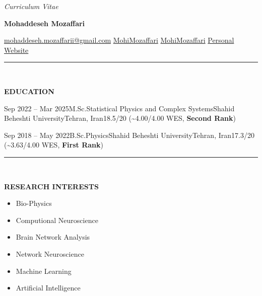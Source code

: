 \documentclass[12pt, b4paper]{cv}
\begin{document}
\begin{center}
	\textit{Curriculum Vitae}\\
	{\Huge \textbf{Mohaddeseh Mozaffari}\par}

	\href{mailto:mohaddeseh.mozaffarii@gmail.com}{ mohaddeseh.mozaffarii@gmail.com}
	\hspace{5pt} 
	\href{https://www.linkedin.com/in/MohiMozaffari/}{ MohiMozaffari}
	\hspace{5pt} 
	\href{https://github.com/MohiMozaffari}{ MohiMozaffari}
	\hspace{5pt} 
	\href{https://mohimozaffari.github.io/}{ Personal Website} 
\end{center}


\vspace{-0.15in}
\rule{\textwidth}{1pt}\\
\vspace{-0.15in}


{\Large \textbf{EDUCATION}}
\vspace{0.1in}


\begin{education}{Sep 2022 -- Mar 2025}{M.Sc.}{Statistical Physics and Complex Systems}{Shahid Beheshti University}{Tehran, Iran}{{18.5/20 (\textasciitilde 4.00/4.00 WES, \textbf{Second Rank})}}%
\end{education}

\begin{education}{Sep 2018 -- May 2022}{B.Sc.}{Physics}{Shahid Beheshti University}{Tehran, Iran}{17.3/20 (\textasciitilde 3.63/4.00 WES, \textbf{First Rank})}
\end{education}

\vspace{-0.15in}
\rule{\textwidth}{1pt}\\
\vspace{-0.15in}


{\Large \textbf{RESEARCH INTERESTS}}

\vspace{-5pt}
\begin{multicols}{3}
	\begin{itemize}[leftmargin=*]
		\setlength\itemsep{-1pt}
				\item Bio-Physics
				\item Computional Neuroscience
				\item Brain Network Analysis
				\item Network Neuroscience
				\item Machine Learning
				\item Artificial Intelligence
	\end{itemize}
\end{multicols}
\end{document}
